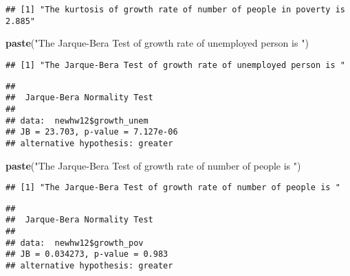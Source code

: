 \documentclass[]{article}
\newenvironment{Shaded}{\begin{snugshade}}{\end{snugshade}}
\newcommand{\KeywordTok}[1]{\textcolor[rgb]{0.13,0.29,0.53}{\textbf{#1}}}
\newcommand{\StringTok}[1]{\textcolor[rgb]{0.31,0.60,0.02}{#1}}
\newcommand{\OperatorTok}[1]{\textcolor[rgb]{0.81,0.36,0.00}{\textbf{#1}}}
\newcommand{\NormalTok}[1]{#1}
\begin{document}
\begin{verbatim}
## [1] "The kurtosis of growth rate of number of people in poverty is  2.885"
\end{verbatim}

\begin{Shaded}
\begin{Highlighting}[]
\KeywordTok{paste}\NormalTok{(}\StringTok{"The Jarque-Bera Test of growth rate of unemployed person is "}\NormalTok{)}
\end{Highlighting}
\end{Shaded}

\begin{verbatim}
## [1] "The Jarque-Bera Test of growth rate of unemployed person is "
\end{verbatim}

\begin{Shaded}
\end{Shaded}

\begin{verbatim}
## 
##  Jarque-Bera Normality Test
## 
## data:  newhw12$growth_unem
## JB = 23.703, p-value = 7.127e-06
## alternative hypothesis: greater
\end{verbatim}

\begin{Shaded}
\begin{Highlighting}[]
\KeywordTok{paste}\NormalTok{(}\StringTok{"The Jarque-Bera Test of growth rate of number of people is "}\NormalTok{)}
\end{Highlighting}
\end{Shaded}

\begin{verbatim}
## [1] "The Jarque-Bera Test of growth rate of number of people is "
\end{verbatim}

\begin{Shaded}
\end{Shaded}

\begin{verbatim}
## 
##  Jarque-Bera Normality Test
## 
## data:  newhw12$growth_pov
## JB = 0.034273, p-value = 0.983
## alternative hypothesis: greater
\end{verbatim}
\end{document}
